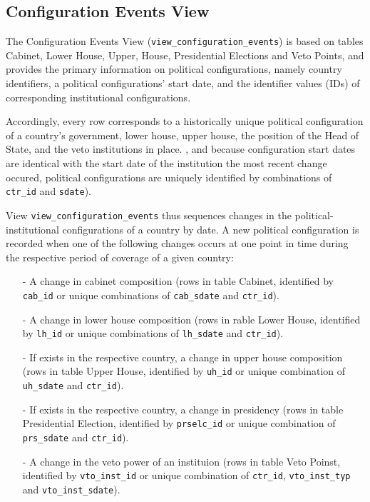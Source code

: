 \subsection{Configuration Events View}\label{subsec_view_configuration_events}
The Configuration Events View (\texttt{view\_configuration\_events}) is based on tables Cabinet, Lower House, Upper, House, Presidential Elections and Veto Points, and provides the primary information on political configurations, namely country identifiers, a political configurations' start date, and the identifier values (IDs) of corresponding institutional configurations.

Accordingly, every row corresponds to a historically unique political configuration of a country's government, lower house, upper house, the position of the Head of State, and the veto institutions in place. 
, and 
because configuration start dates are identical with the start date of the institution the most recent change  occured, political configurations are uniquely identified by combinations of \texttt{ctr\_id} and \texttt{sdate}).

View \texttt{view\_configuration\_events} thus sequences changes in the political-institutional configurations of a country by date.
A new political configuration is recorded when one of the following changes occurs at one point in time during the respective period of coverage of a given country:
\begin{itemize}\itemsep-4pt 
\item[-]{A change in cabinet composition (rows in table Cabinet, identified by \texttt{cab\_id} or unique combinations of \texttt{cab\_sdate} and \texttt{ctr\_id}).}
\item[-]{A change in lower house composition (rows in rable Lower House, identified by \texttt{lh\_id} or unique combinations of \texttt{lh\_sdate} and \texttt{ctr\_id}).}
\item[-]{If exists in the respective country, a change in upper house composition (rows in table Upper House, identified by \texttt{uh\_id} or unique combination of \texttt{uh\_sdate} and \texttt{ctr\_id}).}
\item[-]{If exists in the respective country, a change in presidency (rows in table Presidential Election, identified by \texttt{prselc\_id} or unique combination of \texttt{prs\_sdate} and \texttt{ctr\_id}).}
\item[-]{A change in the veto power of an instituion (rows in table Veto Poinst, identified by \texttt{vto\_inst\_id} or unique combination of \texttt{ctr\_id}, \texttt{vto\_inst\_typ} and \texttt{vto\_inst\_sdate}).}
\end{itemize}

